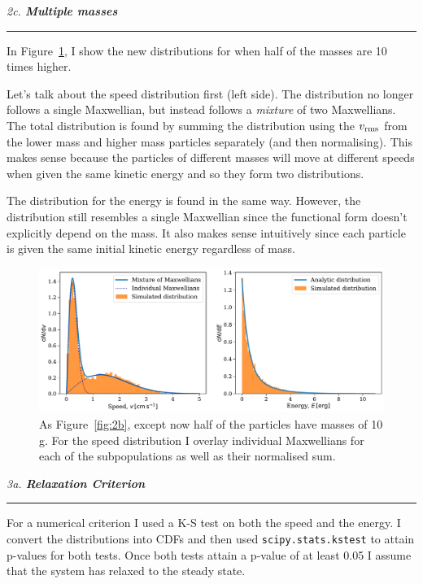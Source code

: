 \documentclass[12pt, letterpaper, twoside]{article}
\newcommand{\question}[1]{{\noindent \it #1}}
\newcommand{\answer}[1]{
    \par\noindent\rule{\textwidth}{0.4pt}#1\vspace{0.5cm}
}
\begin{document}
\question{2c. \textbf{Multiple masses}}
\answer{
    In Figure~\ref{fig:2c_velocity}, I show the new distributions for when half of the masses are 10 times higher.
    
    Let's talk about the speed distribution first (left side). The distribution no longer follows a single Maxwellian, but instead follows a \textit{mixture} of two Maxwellians. The total distribution is found by summing the distribution using the $v_{\rm rms}$ from the lower mass and higher mass particles separately (and then normalising). This makes sense because the particles of different masses will move at different speeds when given the same kinetic energy and so they form two distributions.
    
    The distribution for the energy is found in the same way. However, the distribution still resembles a single Maxwellian since the functional form doesn't explicitly depend on the mass. It also makes sense intuitively since each particle is given the same initial kinetic energy regardless of mass.
    
    \begin{figure}[htb]
        \centering
        \includegraphics[width=\textwidth]{figures/2c.pdf}
        \caption{As Figure~\ref{fig:2b}, except now half of the particles have masses of 10 g. For the speed distribution I overlay individual Maxwellians for each of the subpopulations as well as their normalised sum.}
        \label{fig:2c_velocity}
    \end{figure}
}

\question{3a. \textbf{Relaxation Criterion}}
\answer{
    For a numerical criterion I used a K-S test on both the speed and the energy. I convert the distributions into CDFs and then used \texttt{scipy.stats.kstest} to attain p-values for both tests. Once both tests attain a p-value of at least 0.05 I assume that the system has relaxed to the steady state.
}
\end{document}
